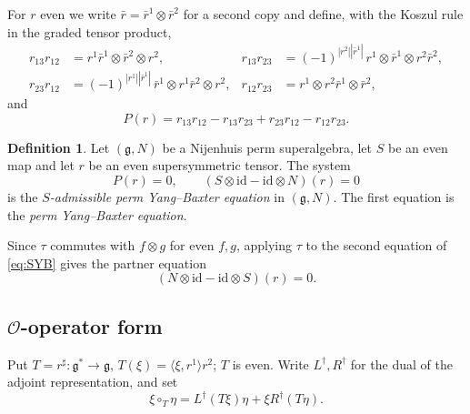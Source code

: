\documentclass[11pt]{article}
\theoremstyle{definition}
\newtheorem{definition}[theorem]{Definition}
\newcommand{\g}{\mathfrak{g}}
\newcommand{\id}{\mathrm{id}}
\newcommand{\lr}[1]{\langle #1\rangle}
\begin{document}
For $r$ even we write $\bar r=\bar r^1\otimes\bar r^2$ for a second copy and define, with the Koszul rule in the graded tensor product,
\begin{align*}
r_{13}r_{12}&=r^1\bar r^1\otimes\bar r^2\otimes r^2,&
r_{13}r_{23}&=(-1)^{|r^2||\bar r^1|}\,r^1\otimes\bar r^1\otimes r^2\bar r^2,\\
r_{23}r_{12}&=(-1)^{|r^1||\bar r^1|}\,\bar r^1\otimes r^1\bar r^2\otimes r^2,&
r_{12}r_{23}&=r^1\otimes r^2\bar r^1\otimes\bar r^2,
\end{align*}
and
\begin{equation}\label{eq:P}
P(r)=r_{13}r_{12}-r_{13}r_{23}+r_{23}r_{12}-r_{12}r_{23}.
\end{equation}

\begin{definition}\label{def:YB}
Let $(\g,N)$ be a Nijenhuis perm superalgebra, let $S$ be an even map and let $r$ be an even supersymmetric tensor. The system
\begin{equation}\label{eq:SYB}
P(r)=0,\qquad (S\otimes\id-\id\otimes N)(r)=0
\end{equation}
is the \emph{$S$-admissible perm Yang--Baxter equation} in $(\g,N)$. The first equation is the \emph{perm Yang--Baxter equation}.
\end{definition}

Since $\tau$ commutes with $f\otimes g$ for even $f,g$, applying $\tau$ to the second equation of \eqref{eq:SYB} gives the partner equation
\[
(N\otimes\id-\id\otimes S)(r)=0.
\]

\subsection{$\mathcal O$-operator form}

Put $T=r^\sharp:\g^*\to\g$, $T(\xi)=\lr{\xi,r^1}r^2$; $T$ is even. Write $L^\dagger,R^\dagger$ for the dual of the adjoint representation, and set
\[
\xi\circ_T\eta=L^\dagger(T\xi)\eta+\xi R^\dagger(T\eta).
\]
\end{document}
